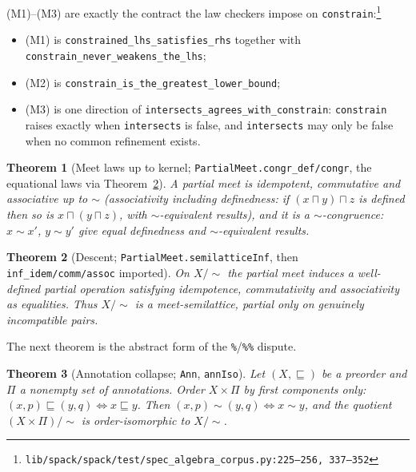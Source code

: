 \documentclass[11pt]{article}
\newtheorem{theorem}{Theorem}[section]
\theoremstyle{definition}
\theoremstyle{remark}
\renewcommand{\ker}{\sim}
\newcommand{\meet}{\sqcap}
\newcommand{\code}[1]{\texttt{#1}}
\newcommand{\src}[1]{\footnote{\code{#1}}}
\begin{document}
(M1)--(M3) are exactly the contract the law checkers impose on
\code{constrain}:\src{lib/spack/spack/test/spec\_algebra\_corpus.py:225--256,
337--352}
\begin{itemize}[itemsep=1pt]
\item (M1) is \code{constrained\_lhs\_satisfies\_rhs} together with\newline
      \code{constrain\_never\_weakens\_the\_lhs};
\item (M2) is \code{constrain\_is\_the\_greatest\_lower\_bound};
\item (M3) is one direction of \code{intersects\_agrees\_with\_constrain}:
      \code{constrain} raises exactly when \code{intersects} is false, and
      \code{intersects} may only be false when no common refinement exists.
\end{itemize}

\begin{theorem}[Meet laws up to kernel; \code{PartialMeet.congr\_def/congr}, the
equational laws via Theorem~\ref{thm:descent}]
\label{thm:meetlaws}
A partial meet is idempotent, commutative and associative up to $\ker$
(associativity including definedness: if $(x \meet y) \meet z$ is defined then
so is $x \meet (y \meet z)$, with $\ker$-equivalent results), and it is a
$\ker$-congruence: $x \ker x'$, $y \ker y'$ give equal definedness and
$\ker$-equivalent results.
\end{theorem}

\begin{theorem}[Descent; \code{PartialMeet.semilatticeInf}, then
\code{inf\_idem/comm/assoc} imported]
\label{thm:descent}
On $X/\!\ker$ the partial meet induces a well-defined partial operation
satisfying idempotence, commutativity and associativity as \emph{equalities}.
Thus $X/\!\ker$ is a meet-semilattice, partial only on genuinely incompatible
pairs.
\end{theorem}

The next theorem is the abstract form of the \code{\%}/\code{\%\%} dispute.

\begin{theorem}[Annotation collapse; \code{Ann}, \code{annIso}]
\label{thm:annotation}
Let $(X, \sqsubseteq)$ be a preorder and $\Pi$ a nonempty set of annotations.
Order $X \times \Pi$ by first components only: $(x,p) \sqsubseteq (y,q) \iff
x \sqsubseteq y$.  Then $(x,p) \ker (y,q) \iff x \ker y$, and the quotient
$(X \times \Pi)/\!\ker$ is order-isomorphic to $X/\!\ker$.
\end{theorem}
\end{document}
